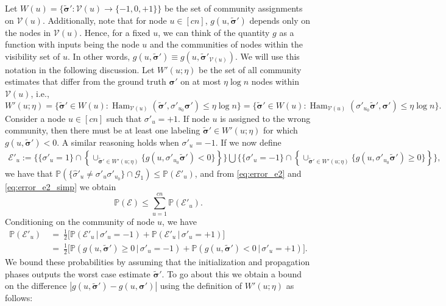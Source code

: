 \documentclass[letterpaper,11pt]{article}
\theoremstyle{definition}
\def\P{\mathbb{P}}
\newcommand{\hsigma}{\hat{\sigma}}
\newcommand{\bsigma}{\bm{\sigma}}
\newcommand{\tbsigma}{\tilde{\bsigma}}
\def\cE{\mathcal{E}}
\def\cG{\mathcal{G}}
\def\cV{\mathcal{V}}
\def\weq{ \ = \ }
\numberwithin{equation}{section}
\newcommand{\Ham}{\operatorname{Ham}}
\theoremstyle{definition}
\def\P{\mathbb{P}}
\newcommand{\hsigma}{\hat{\sigma}}
\newcommand{\bsigma}{\bm{\sigma}}
\newcommand{\tbsigma}{\tilde{\bsigma}}
\def\cE{\mathcal{E}}
\def\cG{\mathcal{G}}
\def\cV{\mathcal{V}}
\def\weq{ \ = \ }
\numberwithin{equation}{section}
\newcommand{\Ham}{\operatorname{Ham}}
\theoremstyle{thmstyletwo}%
\begin{document}
Let $W(u) = \{\tbsigma' : \cV(u) \rightarrow \{-1,0,+1\}\}$ be the set of community assignments on $\cV(u)$.  Additionally, note that for node $u \in [cn]$, $g(u,\tbsigma')$ depends only on the nodes in $\cV(u)$. Hence, for a fixed $u$, we can think of the quantity $g$ as a function with inputs being the node $u$ and the communities of nodes within the visibility set of $u$. In other words, $g(u,\tbsigma') \equiv g(u,\tbsigma'_{\cV(u)})$. We will use this notation in the following discussion. Let $W'(u;\eta)$ be the set of all community estimates that differ from the ground truth $\bsigma'$ on at most $\eta \log n$ nodes within $\cV(u)$, i.e.,
$$
W'(u;\eta) 
= \{\tbsigma' \in W(u): \Ham_{\cV(u)}(\tbsigma', \sigma'_{u_0}\bsigma') \le \eta \log n\}
= \{\tbsigma' \in W(u): \Ham_{\cV(u)}(\sigma'_{u_0}\tbsigma', \bsigma') \le \eta \log n\}.
$$
Consider a node $u\in[cn]$ such that $\sigma'_u = +1$. If node $u$ is assigned to the wrong community, then there must be at least one labeling $\tbsigma' \in W'(u;\eta)$ for which $g(u,\tbsigma') < 0$. A similar reasoning holds when $\sigma'_u= -1$. If we now define
\begin{align*}
\cE'_u 
:= \Big\{\{\sigma'_u = 1\} \cap \left\{\cup_{\tbsigma'\in W'(u;\eta)} \{g(u,\sigma'_{u_0}\tbsigma') < 0 \}\right\}\Big\}
\bigcup \Big\{\{\sigma'_u = -1\} \cap \left\{\cup_{\tbsigma'\in W'(u;\eta)}\{ g(u,\sigma'_{u_0}\tbsigma') \ge 0 \}\right\}\Big\},
\end{align*}
we have that $\P( \{\hsigma'_u \ne \sigma'_u  \sigma'_{u_0}\} \cap \cG_1 ) \le \P(\cE'_u)$, and from \eqref{eq:error_e2} and \eqref{eq:error_e2_simp} we obtain 
\begin{equation}
\P(\cE) \le \sum_{u=1}^{cn} \P(\cE'_u).
\label{eq:errorE2_union}
\end{equation}
Conditioning on the community of node $u$, we have
\begin{align}
\P(\cE'_u)
&\weq \frac{1}{2}\Big[\P(\cE'_u \, | \, \sigma'_u=-1)+\P(\cE'_u \, | \, \sigma'_u=+1)\Big] \nonumber\\
&\weq \frac{1}{2}\Big[\P(g(u,\tbsigma') \ge0 \,|\, \sigma'_u = -1)+\P(g(u,\tbsigma') <0\,|\, \sigma'_u = +1) \Big].
\label{eq:error_Eu}
\end{align}
We bound these probabilities by assuming that the initialization and propagation phases outputs the worst case estimate $\tbsigma'$. To go about this we obtain a bound on the difference $|g(u,\tbsigma') - g(u,\bsigma')|$ using the definition of $W'(u;\eta)$ as follows:
\end{document}
